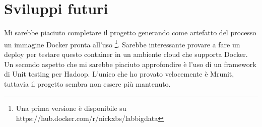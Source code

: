 \documentclass[paper=a4, fontsize=11pt]{scrartcl}	%
\numberwithin{equation}{section}															%
\numberwithin{figure}{section}																%
\numberwithin{table}{section}																%
\begin{document}
\section{Sviluppi futuri}
Mi sarebbe piaciuto completare il progetto generando come artefatto del processo un immagine Docker pronta all'uso \protect\footnote{Una prima versione è disponibile su https://hub.docker.com/r/nickxbs/labbigdata }. Sarebbe interessante provare a fare un deploy per testare questo container in un ambiente cloud che supporta Docker.\\
Un secondo aspetto che mi sarebbe piaciuto approfondire è l'uso di un framework di Unit testing per Hadoop. L'unico che ho provato velocemente è Mrunit, tuttavia il progetto sembra non essere più mantenuto.
\end{document}
